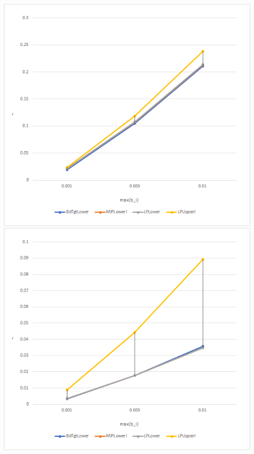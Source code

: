 \documentclass[11pt]{article}
\theoremstyle{plain}
\theoremstyle{definition}
\theoremstyle{remark}
\begin{document}
\begin{table}[h]
\begin{center}
\includegraphics[scale=0.45]{Figures/Case5}
\includegraphics[scale=0.45]{Figures/Case9} \\

\end{center}
\end{table}
\end{document}
